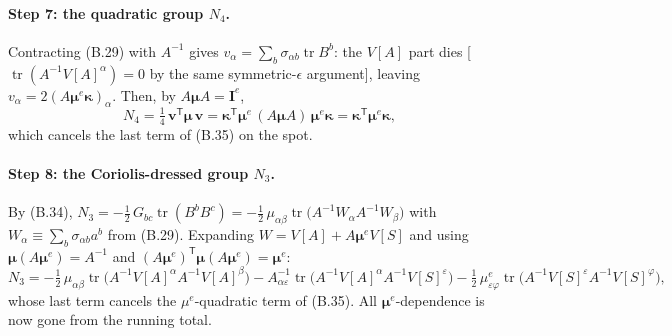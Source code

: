 \paragraph{Step 7: the quadratic group $N_4$.}
Contracting (B.29) with $A^{-1}$ gives $v_\alpha=\sum_b\sigma_{\alpha b}\operatorname{tr}B^b$: the $V[A]$ part dies [$\operatorname{tr}(A^{-1}V[A]^{\alpha})=0$ by the same symmetric-$\epsilon$ argument], leaving $v_\alpha=2(A\boldsymbol\mu^{e}\boldsymbol\kappa)_\alpha$. Then, by $A\boldsymbol\mu A=\mathbf I^{e}$,
\begin{equation}
N_4=\tfrac14\,\mathbf v^{\mathsf T}\boldsymbol\mu\,\mathbf v
=\boldsymbol\kappa^{\mathsf T}\boldsymbol\mu^{e}\,(A\boldsymbol\mu A)\,\boldsymbol\mu^{e}\boldsymbol\kappa
=\boldsymbol\kappa^{\mathsf T}\boldsymbol\mu^{e}\boldsymbol\kappa , \tag{B.37}
\end{equation}
which cancels the last term of (B.35) on the spot.

\paragraph{Step 8: the Coriolis-dressed group $N_3$.}
By (B.34), $N_3=-\tfrac12\,G_{bc}\operatorname{tr}(B^bB^c)=-\tfrac12\,\mu_{\alpha\beta}\operatorname{tr}\bigl(A^{-1}W_\alpha A^{-1}W_\beta\bigr)$ with $W_\alpha\equiv\sum_b\sigma_{\alpha b}a^b$ from (B.29). Expanding $W=V[A]+A\boldsymbol\mu^{e}V[S]$ and using $\boldsymbol\mu(A\boldsymbol\mu^{e})=A^{-1}$ and $(A\boldsymbol\mu^{e})^{\mathsf T}\boldsymbol\mu(A\boldsymbol\mu^{e})=\boldsymbol\mu^{e}$:
\begin{equation}
N_3=-\tfrac12\,\mu_{\alpha\beta}\operatorname{tr}\bigl(A^{-1}V[A]^{\alpha}A^{-1}V[A]^{\beta}\bigr)
-A^{-1}_{\alpha\varepsilon}\operatorname{tr}\bigl(A^{-1}V[A]^{\alpha}A^{-1}V[S]^{\varepsilon}\bigr)
-\tfrac12\,\mu^{e}_{\varepsilon\varphi}\operatorname{tr}\bigl(A^{-1}V[S]^{\varepsilon}A^{-1}V[S]^{\varphi}\bigr) , \tag{B.38}
\end{equation}
whose last term cancels the $\mu^{e}$-quadratic term of (B.35). All $\boldsymbol\mu^{e}$-dependence is now gone from the running total.

